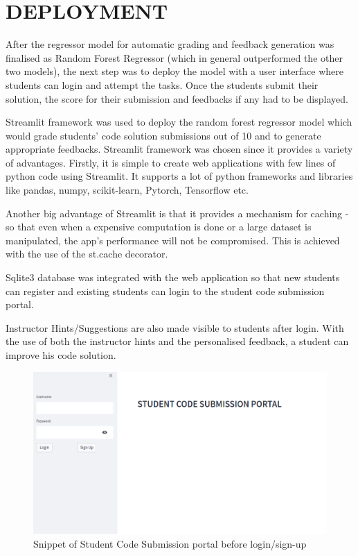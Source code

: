 
\chapter{DEPLOYMENT}

After the regressor model for automatic grading and feedback generation was finalised as Random Forest Regressor (which in general outperformed the other two models), the next step was to deploy the model with a user interface where students can login and attempt the tasks. Once the students submit their solution, the score for their submission and feedbacks if any had to be displayed.

Streamlit framework was used to deploy the random forest regressor model which would grade students' code solution submissions out of 10 and to generate appropriate feedbacks. Streamlit framework was chosen since it provides a variety of advantages. Firstly, it is simple to create web applications with few lines of python code using Streamlit. It supports a lot of python frameworks and libraries like pandas, numpy, scikit-learn, Pytorch, Tensorflow etc.

Another big advantage of Streamlit is that it provides a mechanism for caching - so that even when a expensive computation is done or a large dataset is manipulated, the app's performance will not be compromised.
This is achieved with the use of the st.cache decorator.

Sqlite3 database was integrated with the web application so that new students can register and existing students can login to the student code submission portal. 

Instructor Hints/Suggestions are also made visible to students after login. With the use of both the instructor hints and the personalised feedback, a student can improve his code solution.



\newpage
\begin{figure}[H]
\centering
\includegraphics[scale=0.56,frame]{./figures/dep1.png}
\caption{Snippet of Student Code Submission portal before login/sign-up}
\label{fig1}
\end{figure}

